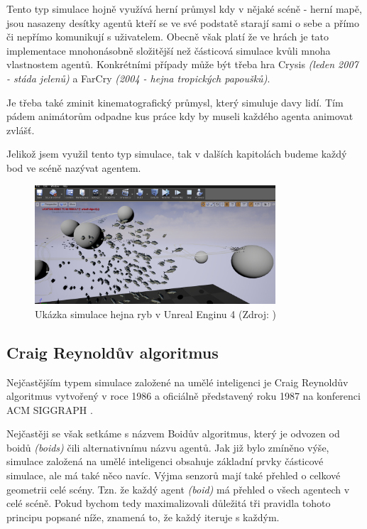 \documentclass[czech,public,dept460,male,cpdeclaration]{diploma}
\begin{document}
Tento typ simulace hojně využívá herní průmysl kdy v nějaké scéně - herní mapě, jsou nasazeny desítky agentů kteří se ve své podstatě starají sami o sebe a přímo či nepřímo komunikují s uživatelem. Obecně však platí že ve hrách je tato implementace mnohonásobně složitější než částicová simulace kvůli mnoha vlastnostem agentů. Konkrétními případy může být třeba hra Crysis \textit{(leden 2007 - stáda jelenů)} a FarCry \textit{(2004 - hejna tropických papoušků)}.

Je třeba také zminit kinematografický průmysl, který simuluje davy lidí. Tím pádem animátorům odpadne kus práce kdy by museli každého agenta animovat zvlášť.

Jelikož jsem využil tento typ simulace, tak v dalších kapitolách budeme každý bod ve scéně nazývat agentem.

\begin{figure}\centering\includegraphics[width=0.8\textwidth]{Figures/flock_fish.png}
	\caption{
		Ukázka simulace hejna ryb v Unreal Enginu 4 (Zdroj: \cite{linkToUnrealEngineFish})
	}
\end{figure}

\subsection{Craig Reynoldův algoritmus}

Nejčastějším typem simulace založené na umělé inteligenci je Craig Reynoldův algoritmus  vytvořený v roce 1986 a oficiálně představený roku 1987 na konferenci ACM SIGGRAPH \cite{linkToACM, linkToSIGGRAPH}.

Nejčastěji se však setkáme s názvem Boidův algoritmus, který je odvozen od boidů \textit{(boids)} čili alternativnímu názvu agentů. Jak již bylo zmíněno výše, simulace založená na
umělé inteligenci obsahuje základní prvky částicové simulace, ale má také něco navíc. Výjma senzorů mají také přehled o celkové geometrii celé scény. Tzn. že každý agent \textit{(boid)} má přehled o všech agentech v celé scéně. Pokud bychom tedy maximalizovali důležitá tři pravidla tohoto principu popsané níže, znamená to, že každý iteruje s každým.
\end{document}
